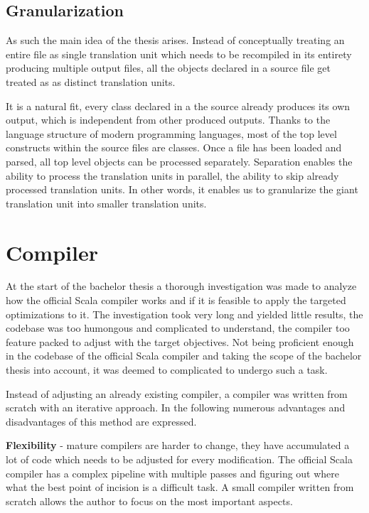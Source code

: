 \documentclass{VUMIFPSbakalaurinis}
\begin{document}
\subsection{Granularization}

As such the main idea of the thesis arises.
Instead of conceptually treating an entire file as single translation unit which needs to be recompiled in its entirety producing multiple output files, all the objects declared in a source file get treated as as distinct translation units.

It is a natural fit, every class declared in a the source already produces its own output, which is independent from other produced outputs.
Thanks to the language structure of modern programming languages, most of the top level constructs within the source files are classes.
Once a file has been loaded and parsed, all top level objects can be processed separately.
Separation enables the ability to process the translation units in parallel, the ability to skip already processed translation units. In other words, it enables us to granularize the giant translation unit into smaller translation units.

\section{Compiler}
At the start of the bachelor thesis a thorough investigation was made to analyze how the official Scala compiler works \cite{ScalaGithub} and if it is feasible to apply the targeted optimizations to it.
The investigation took very long and yielded little results, the codebase was too humongous and complicated to understand, the compiler too feature packed to adjust with the target objectives.
Not being proficient enough in the codebase of the official Scala compiler and taking the scope of the bachelor thesis into account, it was deemed to complicated to undergo such a task.

Instead of adjusting an already existing compiler, a compiler was written from scratch with an iterative approach.
In the following numerous advantages and disadvantages of this method are expressed.

\textbf{Flexibility} - mature compilers are harder to change, they have accumulated a lot of code which needs to be adjusted for every modification.
The official Scala compiler has a complex pipeline with multiple passes and figuring out where what the best point of incision is a difficult task.
A small compiler written from scratch allows the author to focus on the most important aspects.
\end{document}
